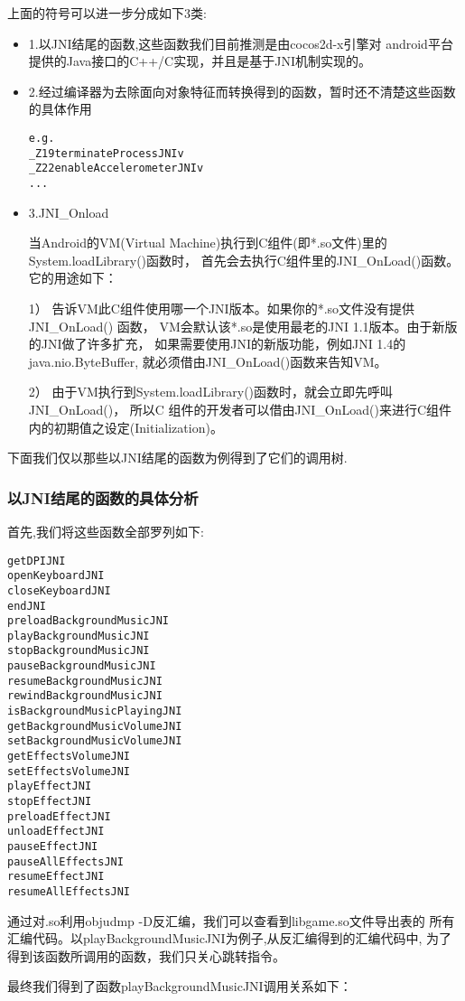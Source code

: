 上面的符号可以进一步分成如下3类:
\begin{itemize}
\item 1.以JNI结尾的函数,这些函数我们目前推测是由cocos2d-x引擎对
android平台提供的Java接口的C++/C实现，并且是基于JNI机制实现的。
\item 2.经过编译器为去除面向对象特征而转换得到的函数，暂时还不清楚这些函数的具体作用
\begin{lstlisting}
e.g.
_Z19terminateProcessJNIv
_Z22enableAccelerometerJNIv
...
\end{lstlisting}
\item 3.JNI\_Onload

当Android的VM(Virtual Machine)执行到C组件(即*.so文件)里的 System.loadLibrary()函数时，
首先会去执行C组件里的JNI\_OnLoad()函数。它的用途如下：
 
1） 告诉VM此C组件使用哪一个JNI版本。如果你的*.so文件没有提供JNI\_OnLoad() 函数，
    VM会默认该*.so是使用最老的JNI 1.1版本。由于新版的JNI做了许多扩充，
    如果需要使用JNI的新版功能，例如JNI 1.4的 java.nio.ByteBuffer, 
    就必须借由JNI\_OnLoad()函数来告知VM。

2） 由于VM执行到System.loadLibrary()函数时，就会立即先呼叫JNI\_OnLoad()，
    所以C 组件的开发者可以借由JNI\_OnLoad()来进行C组件内的初期值之设定(Initialization)。\\
\end{itemize}
下面我们仅以那些以JNI结尾的函数为例得到了它们的调用树.

\subsubsection{以JNI结尾的函数的具体分析}
首先,我们将这些函数全部罗列如下:
\begin{lstlisting}
getDPIJNI
openKeyboardJNI
closeKeyboardJNI
endJNI
preloadBackgroundMusicJNI
playBackgroundMusicJNI
stopBackgroundMusicJNI
pauseBackgroundMusicJNI
resumeBackgroundMusicJNI
rewindBackgroundMusicJNI
isBackgroundMusicPlayingJNI
getBackgroundMusicVolumeJNI
setBackgroundMusicVolumeJNI
getEffectsVolumeJNI
setEffectsVolumeJNI
playEffectJNI
stopEffectJNI
preloadEffectJNI
unloadEffectJNI
pauseEffectJNI
pauseAllEffectsJNI
resumeEffectJNI
resumeAllEffectsJNI
\end{lstlisting}

通过对.so利用objudmp -D反汇编，我们可以查看到libgame.so文件导出表的
所有汇编代码。以playBackgroundMusicJNI为例子,从反汇编得到的汇编代码中,
为了得到该函数所调用的函数，我们只关心跳转指令。

最终我们得到了函数playBackgroundMusicJNI调用关系如下：

